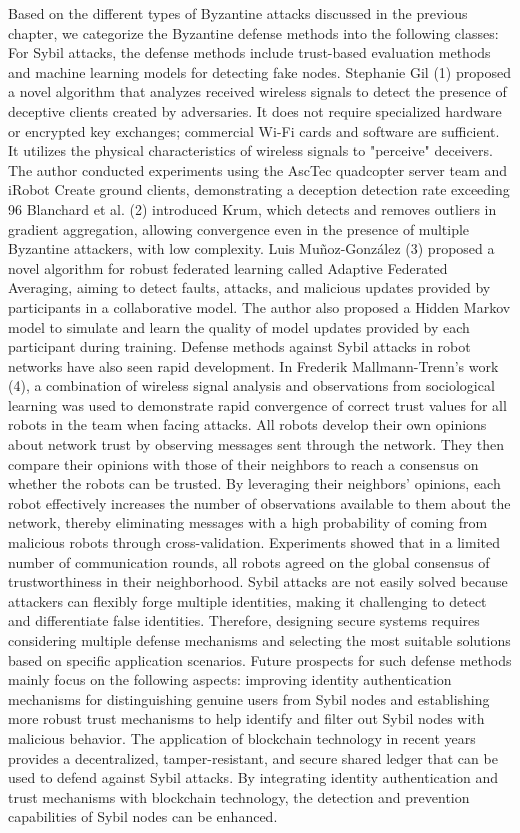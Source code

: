 \documentclass[conference]{IEEEtran}
\begin{document}
Based on the different types of Byzantine attacks discussed in the previous chapter, we categorize the Byzantine defense methods into the following classes:
For Sybil attacks, the defense methods include trust-based evaluation methods and machine learning models for detecting fake nodes.
Stephanie Gil (1) proposed a novel algorithm that analyzes received wireless signals to detect the presence of deceptive clients created by adversaries. It does not require specialized hardware or encrypted key exchanges; commercial Wi-Fi cards and software are sufficient. It utilizes the physical characteristics of wireless signals to "perceive" deceivers. The author conducted experiments using the AscTec quadcopter server team and iRobot Create ground clients, demonstrating a deception detection rate exceeding 96%
Blanchard et al. (2) introduced Krum, which detects and removes outliers in gradient aggregation, allowing convergence even in the presence of multiple Byzantine attackers, with low complexity.
Luis Muñoz-González (3) proposed a novel algorithm for robust federated learning called Adaptive Federated Averaging, aiming to detect faults, attacks, and malicious updates provided by participants in a collaborative model. The author also proposed a Hidden Markov model to simulate and learn the quality of model updates provided by each participant during training.
Defense methods against Sybil attacks in robot networks have also seen rapid development. In Frederik Mallmann-Trenn's work (4), a combination of wireless signal analysis and observations from sociological learning was used to demonstrate rapid convergence of correct trust values for all robots in the team when facing attacks. All robots develop their own opinions about network trust by observing messages sent through the network. They then compare their opinions with those of their neighbors to reach a consensus on whether the robots can be trusted. By leveraging their neighbors' opinions, each robot effectively increases the number of observations available to them about the network, thereby eliminating messages with a high probability of coming from malicious robots through cross-validation. Experiments showed that in a limited number of communication rounds, all robots agreed on the global consensus of trustworthiness in their neighborhood.
Sybil attacks are not easily solved because attackers can flexibly forge multiple identities, making it challenging to detect and differentiate false identities. Therefore, designing secure systems requires considering multiple defense mechanisms and selecting the most suitable solutions based on specific application scenarios. Future prospects for such defense methods mainly focus on the following aspects: improving identity authentication mechanisms for distinguishing genuine users from Sybil nodes and establishing more robust trust mechanisms to help identify and filter out Sybil nodes with malicious behavior. The application of blockchain technology in recent years provides a decentralized, tamper-resistant, and secure shared ledger that can be used to defend against Sybil attacks. By integrating identity authentication and trust mechanisms with blockchain technology, the detection and prevention capabilities of Sybil nodes can be enhanced.
\end{document}
